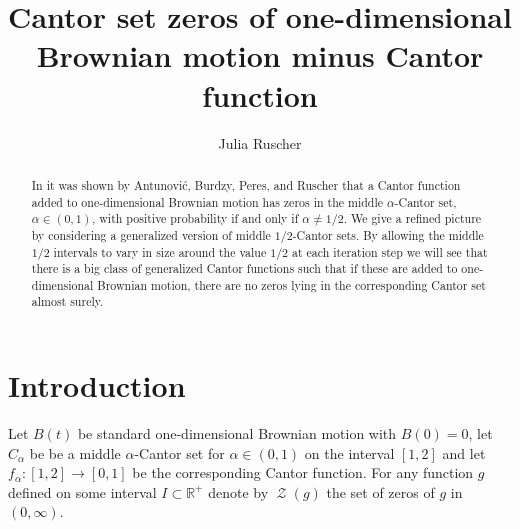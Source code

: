 \documentclass[11pt,reqno]{amsart}
\theoremstyle{plain}
\theoremstyle{definition}
\theoremstyle{remark}
\begin{document}
\title[Cantor set zeros of Brownian motion -- Cantor function]{Cantor set zeros of one-dimensional Brownian motion minus Cantor function}

\author[J. Ruscher]{Julia Ruscher}

\address{
Fachbereich Mathematik\\
Technische Universit\"{a}t Berlin\\
Strasse des 17. Juni 136\\
D-10623 Berlin\\
and
\newline
Institute for Advanced Study\\
Einstein Drive\\
Princeton, NJ 08540
}




\begin{abstract}
In \cite{ABPR} it was shown by Antunovi\'{c}, Burdzy, Peres, and Ruscher that a Cantor function added to one-dimensional Brownian motion has zeros in the middle $\alpha$-Cantor set, $\alpha \in (0,1)$, with positive probability if and only if $\alpha \neq 1/2$.
We give a refined picture by considering a generalized version of middle $1/2$-Cantor sets. By allowing the middle $1/2$ intervals to vary in size around the value $1/2$ at each iteration step we will see that there is a big class of generalized Cantor functions such that if these are added to one-dimensional Brownian motion, there are no zeros lying in the corresponding Cantor set almost surely.

\end{abstract}
\maketitle

\section{Introduction}

Let $B(t)$ be standard one-dimensional Brownian motion with $B(0)=0$, let $C_\alpha$ be be a middle $\alpha$-Cantor set for $\alpha \in (0,1)$ on the interval $[1,2]$ and let $f_\alpha \colon [1,2] \to [0,1]$ be the corresponding Cantor function.
For any function $g$ defined on some interval $I \subset \mathbb{R}^+$ denote by $\operatorname{\mathcal{Z}}(g)$ the set of zeros of $g$ in $(0,\infty)$.
\end{document}
